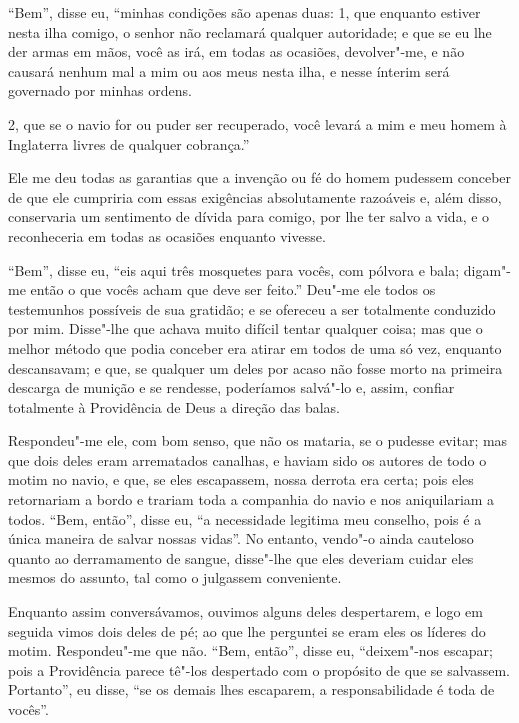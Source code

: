 ``Bem'', disse eu, ``minhas condições são apenas duas: 1, que enquanto
estiver nesta ilha comigo, o senhor não reclamará qualquer autoridade; e
que se eu lhe der armas em mãos, você as irá, em todas as ocasiões,
devolver"-me, e não causará nenhum mal a mim ou aos meus nesta ilha, e
nesse ínterim será governado por minhas ordens.

2, que se o navio for ou puder ser recuperado, você levará a mim e meu
homem à Inglaterra livres de qualquer cobrança.''

Ele me deu todas as garantias que a invenção ou fé do homem pudessem
conceber de que ele cumpriria com essas exigências absolutamente
razoáveis e, além disso, conservaria um sentimento de dívida para
comigo, por lhe ter salvo a vida, e o reconheceria em todas as ocasiões
enquanto vivesse.

``Bem'', disse eu, ``eis aqui três mosquetes para vocês, com pólvora e
bala; digam"-me então o que vocês acham que deve ser feito.'' Deu"-me ele
todos os testemunhos possíveis de sua gratidão; e se ofereceu a ser
totalmente conduzido por mim. Disse"-lhe que achava muito difícil tentar
qualquer coisa; mas que o melhor método que podia conceber era atirar em
todos de uma só vez, enquanto descansavam; e que, se qualquer um deles
por acaso não fosse morto na primeira descarga de munição e se rendesse,
poderíamos salvá"-lo e, assim, confiar totalmente à Providência de Deus a
direção das balas.

Respondeu"-me ele, com bom senso, que não os mataria, se o pudesse
evitar; mas que dois deles eram arrematados canalhas, e haviam sido os
autores de todo o motim no navio, e que, se eles escapassem, nossa
derrota era certa; pois eles retornariam a bordo e trariam toda a
companhia do navio e nos aniquilariam a todos. ``Bem, então'', disse eu,
``a necessidade legitima meu conselho, pois é a única maneira de salvar
nossas vidas''. No entanto, vendo"-o ainda cauteloso quanto ao
derramamento de sangue, disse"-lhe que eles deveriam cuidar eles mesmos
do assunto, tal como o julgassem conveniente.

Enquanto assim conversávamos, ouvimos alguns deles despertarem, e logo
em seguida vimos dois deles de pé; ao que lhe perguntei se eram eles os
líderes do motim. Respondeu"-me que não. ``Bem, então'', disse eu,
``deixem"-nos escapar; pois a Providência parece tê"-los despertado com o
propósito de que se salvassem. Portanto'', eu disse, ``se os demais lhes
escaparem, a responsabilidade é toda de vocês''.

